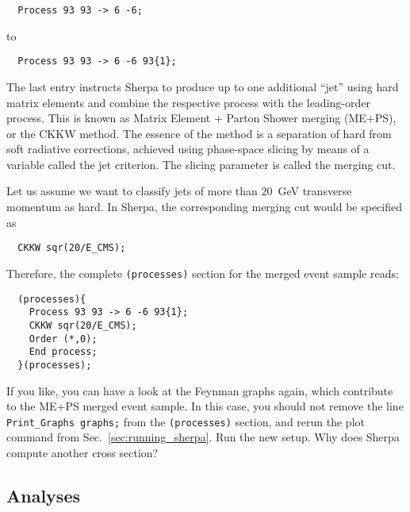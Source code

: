 \documentclass[10pt]{article}
\begin{document}
\begin{verbatim}
  Process 93 93 -> 6 -6;
\end{verbatim}
to
\begin{verbatim}
  Process 93 93 -> 6 -6 93{1};
\end{verbatim}
The last entry instructs Sherpa to produce up to one additional ``jet'' using
hard matrix elements and combine the respective process with the leading-order process.
This is known as Matrix Element + Parton Shower merging (ME+PS), or the CKKW method.
The essence of the method is a separation of hard from soft radiative corrections,
achieved using phase-space slicing by means of a variable called the jet criterion. The slicing parameter is called the merging cut.

Let us assume we want to classify jets of more than 20~GeV transverse momentum as hard.
In Sherpa, the corresponding merging cut would be specified as
\begin{verbatim}
  CKKW sqr(20/E_CMS);
\end{verbatim}
Therefore, the complete {\tt (processes)} section for the merged event sample reads:
\begin{verbatim}
  (processes){
    Process 93 93 -> 6 -6 93{1};
    CKKW sqr(20/E_CMS);
    Order (*,0);
    End process;
  }(processes);
\end{verbatim}
If you like, you can have a look at the Feynman graphs again, which contribute
to the ME+PS merged event sample. In this case, you should not remove the line
{\tt Print\_Graphs graphs;} from the {\tt (processes)} section, and rerun the
plot command from Sec.~\ref{sec:running_sherpa}.
%
Run the new setup. Why does Sherpa compute another cross section?

\subsection{Analyses}
\end{document}
